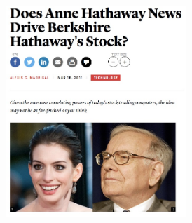 \documentclass[xetex,mathserif,serif,aspectratio=169]{beamer}
\begin{document}
\begin{frame}[fragile] \frametitle{} \oldB \small

\begin{center}
\includegraphics[height=8cm]{img/hathaway.jpg}
\end{center}

\end{frame}
\end{document}
